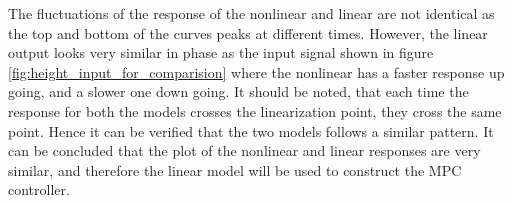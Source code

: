 The fluctuations of the response of the nonlinear and linear are not identical as the top and bottom of the curves peaks at different times. However, the linear output looks very similar in phase as the input signal shown in figure \ref{fig:height_input_for_comparision} where the nonlinear has a faster response up going, and a slower one down going. It should be noted, that each time the response for both the models crosses the linearization point, they cross the same point. Hence it can be verified that the two models follows a similar pattern. It can be concluded that the plot of the nonlinear and linear responses are very similar, and therefore the linear model will be used to construct the MPC controller.  
